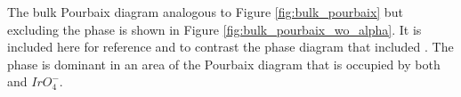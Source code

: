 

\begin{table}
\centering
\caption{\label{table:bulk_pourb}
%
Enthalpy (\DHf) and free energies (\DGf) of formation per formula unit (f.u.) for the species that make up the bulk Pourbaix diagrams
(see Figures \ref{fig:bulk_pourbaix} and \ref{fig:bulk_pourbaix_wo_alpha}).
%
The Ir metal reference is fitted such that the experimental \DHf of \rIrOtwo is reproduced.~\cite{Barin1995}
%
The $IrO_{4}^{-}$ ion species energy is taken from Douglas (1988)~\cite{Adams1988}.
}

\end{table}


%
%
The bulk Pourbaix diagram analogous to Figure \ref{fig:bulk_pourbaix} but excluding the \aIrOthree phase is shown in Figure \ref{fig:bulk_pourbaix_wo_alpha}.
%
It is included here for reference and to contrast the phase diagram that included \aIrOthree.
%
The \aIrOthree phase is dominant in an area of the Pourbaix diagram that is occupied by both \rIrOtwo and $IrO_{4}^{-}$.


